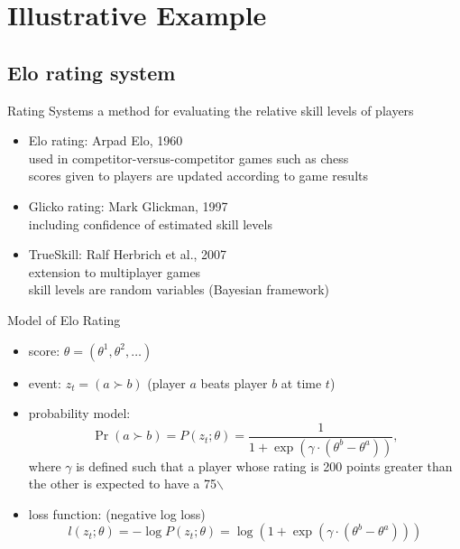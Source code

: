 \documentclass[fleqn,aspectratio=1610]{beamer}
\begin{document}
\section{Illustrative Example}
\label{sec:org86c488c}

\subsection{Elo rating system}
\label{sec:orga7ed499}
\begin{frame}[label={sec:orga68c41f}]{Rating Systems}
a method for evaluating the relative skill levels of players
\begin{itemize}
\item Elo rating: Arpad Elo, 1960\\[0pt]
used in competitor-versus-competitor games such as chess\\[0pt]
scores given to players are updated according to game results
\item Glicko rating: Mark Glickman, 1997\\[0pt]
including confidence of estimated skill levels
\item TrueSkill: Ralf Herbrich et al., 2007\\[0pt]
extension to multiplayer games\\[0pt]
skill levels are random variables (Bayesian framework)
\end{itemize}
\end{frame}

\begin{frame}[label={sec:orga72016b}]{Model of Elo Rating}
\begin{itemize}
\item score: \(\theta=(\theta^{1},\theta^{2},\dotsc)\)
\item event: \(z_{t}=(a\succ b)\) (player \(a\) beats player \(b\) at time \(t\))
\item probability model: 
\begin{equation}
  \Pr(a\succ b)
  =P(z_{t};\theta)
  =\frac{1}{1+\exp(\gamma\cdot(\theta^{b}-\theta^{a}))},
\end{equation}
where \(\gamma\) is defined such that
a player whose rating is 200 points greater than the other
is expected to have a 75$\backslash$%
\item loss function: (negative log loss)
\begin{equation}
  l(z_{t};\theta)
  =-\log P(z_{t};\theta)
  =\log(1+\exp(\gamma\cdot(\theta^{b}-\theta^{a})))
\end{equation}
\end{itemize}
\end{frame}
\end{document}
